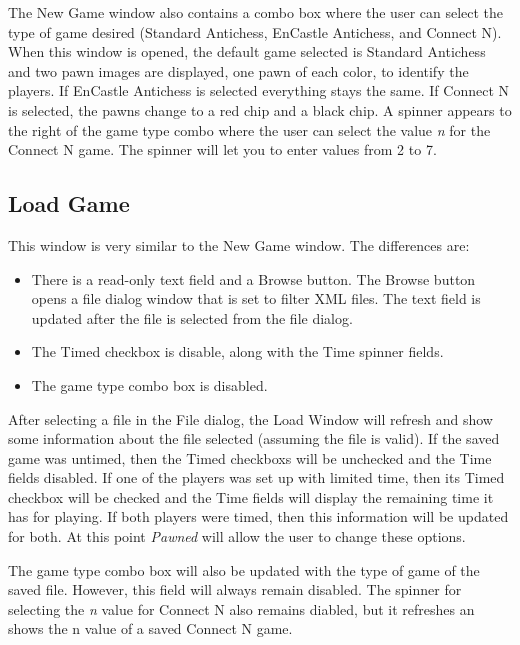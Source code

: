 			The New Game window also contains a combo box where the user can select the 
			type of game desired (Standard Antichess, EnCastle Antichess, and Connect N).
			When this window is opened, the default game selected is Standard Antichess and
			two pawn images are displayed, one pawn of each color, to identify the players. 
			If EnCastle Antichess is selected everything stays the same. If Connect N is 
			selected, the pawns change to a red chip and a black chip. A spinner appears to
			the right of the game type combo where the user can select the value \textsl{n} 
			for the Connect N game. The spinner will let you to enter values from 2 to 7.
			
			\subsection{Load Game}
			
			This window is very similar to the New Game window. The differences are:
				\begin{itemize}
					\item There is a read-only text field and a Browse button. The Browse
								button opens a file dialog window that is set to filter XML files.
								The text field is updated after the file is selected from the file
								dialog. 
					\item The Timed checkbox is disable, along with the Time spinner fields.
					\item The game type combo box is disabled.
				\end{itemize}
				
			After selecting a file in the File dialog, the Load Window will refresh and
			show some information about the file selected (assuming the file is valid).
			If the saved game was untimed, then the Timed checkboxs will be unchecked and
			the Time fields disabled. If one of the players was set up with limited time, 
			then its Timed checkbox will be checked and the Time fields will display the
			remaining time it has for playing. If both players were timed, then this
			information will be updated for both. At this point \emph{Pawned} will allow 
			the user to change these options. 
			
			The game type combo box will also be updated with the type of game of the 
			saved file. However, this field will always remain disabled. The spinner for
			selecting the \textsl{n} value for Connect N also remains diabled, but it
			refreshes an shows the n value of a saved Connect N game.
			
